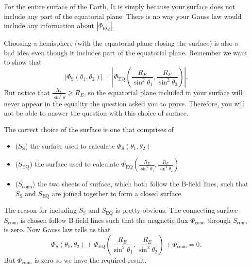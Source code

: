 \documentclass[a4paper]{article}
\begin{document}
For the entire surface of the Earth, It is simply because your surface does not include any part of the equatorial plane. There is no way your Gauss law would include any information about $|\Phi_\text{EQ}|$.

Choosing a hemisphere (with the equatorial plane closing the surface) is also a bad idea even though it includes part of the equatorial plane. Remember we want to show that 
\[
|\Phi_\text{S}(\theta_1, \theta_2)| = \left|\Phi_\text{EQ}\left(\frac{R_E}{\sin^2\theta_1}, \frac{R_E}{\sin^2\theta_2}\right)\right| 
.\] 
But notice that $\frac{R_E}{\sin^2\theta} \geq R_E$, so the equatorial plane included in your surface will never appear in the equality the question asked you to prove. Therefore, you will not be able to answer the question with this choice of surface.

The correct choice of the surface is one that comprises of
\begin{itemize}
    \item ($S_\text{S}$) the surface used to calculate $\Phi_\text{S}(\theta_1, \theta_2)$
    \item ($S_\text{EQ}$) the surface used to calculate $\Phi_\text{EQ}\left(\frac{R_E}{\sin^2\theta_1}, \frac{R_E}{\sin^2\theta_2}\right) $
    \item ($S_\text{conn}$) the two sheets of surface, which both follow the B-field lines, such that $S_\text{S}$ and $S_\text{EQ}$ are joined together to form a closed surface. 
\end{itemize}
The reason for including $S_\text{S}$ and $S_\text{EQ}$ is pretty obvious. The connecting surface $S_\text{conn}$ is chosen follow B-field lines such that the magnetic flux $\Phi_\text{conn}$ through $S_\text{conn}$ is zero. 
Now Gauss law tells us that
\[
\Phi_\text{S}(\theta_1, \theta_2) + \Phi_\text{EQ}\left(\frac{R_E}{\sin^2\theta_1}, \frac{R_E}{\sin^2\theta_2}\right) + \Phi_\text{conn} = 0
.\] 
But $\Phi_\text{conn}$ is zero so we have the required result.
\end{document}

